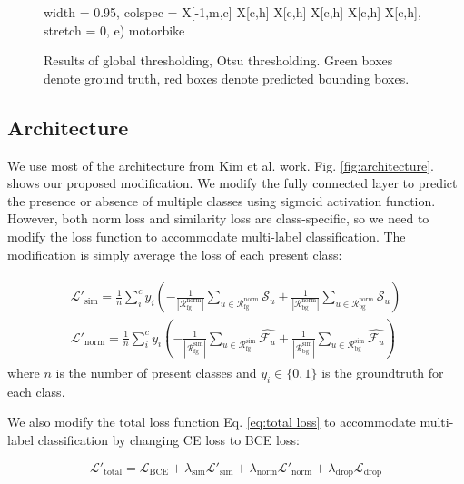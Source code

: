 \documentclass[conference]{IEEEtran}
\begin{document}
\begin{figure}
\begin{tblr}{
            width = 0.95\textwidth,
            colspec = {X[-1,m,c] X[c,h] X[c,h] X[c,h] X[c,h] X[c,h]},
            stretch = 0,
        }
e) motorbike \\
    \end{tblr}
    \caption{Results of global thresholding, Otsu thresholding. Green boxes denote ground truth, red boxes denote predicted bounding boxes.}
    \label{fig:img result}
\end{figure}

\subsection{Architecture}
We use most of the architecture from Kim et al. \cite{kim2022bridging} work. Fig. \ref{fig:architecture}. shows our proposed modification. We modify the fully connected layer to predict the presence or absence of multiple classes using sigmoid activation function. However, both norm loss and similarity loss are class-specific, so we need to modify the loss function to accommodate multi-label classification. The modification is simply average the loss of each present class:

\begin{gather} \label{eq:modified loss}
    \begin{align}
        \mathcal{L}'_{\text{sim}} = \frac{1}{n}\sum_{i}^{c}y_i (-\frac{1}{|\mathcal{R}_{\text{fg}}^{\text{norm}}|} \sum_{u\in\mathcal{R}_{\text{fg}}^{\text{norm}}}{\mathcal{S}_u} + \frac{1}{|\mathcal{R}_{\text{bg}}^{\text{norm}}|} \sum_{u\in\mathcal{R}_{\text{bg}}^{\text{norm}}}{\mathcal{S}_u}) \\
        \mathcal{L}'_{\text{norm}} = \frac{1}{n}\sum_{i}^{c}y_i (-\frac{1}{|\mathcal{R}_{\text{fg}}^{\text{sim}}|}\sum_{u\in\mathcal{R}_{\text{fg}}^{\text{sim}}}{\hat{\mathcal{F}_u}} + \frac{1}{|\mathcal{R}_{\text{bg}}^{\text{sim}}|}\sum_{u\in\mathcal{R}_{\text{bg}}^{\text{sim}}}{\hat{\mathcal{F}_u}})
    \end{align}
\end{gather}
where $n$ is the number of present classes and $y_i \in \{0, 1\}$ is the groundtruth for each class.

We also modify the total loss function Eq. \ref{eq:total loss} to accommodate multi-label classification by changing CE loss to BCE loss:

\begin{equation}
    \mathcal{L}'_{\text{total}} = \mathcal{L}_{\text{BCE}} + \lambda_{\text{sim}}\mathcal{L}'_{\text{sim}} + \lambda_{\text{norm}}\mathcal{L}'_{\text{norm}} + \lambda_{\text{drop}}\mathcal{L}_{\text{drop}}
\end{equation}
\end{document}
